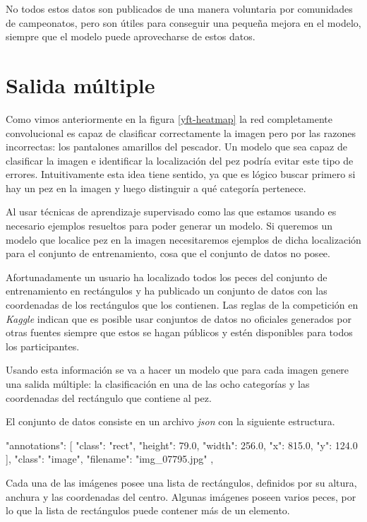 No todos estos datos son publicados de una manera voluntaria por comunidades de campeonatos, pero son útiles para conseguir una pequeña mejora en el modelo, siempre que el modelo puede aprovecharse de estos datos.

\section{Salida múltiple}

Como vimos anteriormente en la figura \ref{yft-heatmap} la red completamente
convolucional es capaz de clasificar correctamente la imagen pero por las
razones incorrectas: los pantalones amarillos del pescador. Un modelo que sea
capaz de clasificar la imagen e identificar la localización del pez podría
evitar este tipo de errores. Intuitivamente esta idea tiene sentido, ya que es lógico
buscar primero si hay un pez en la imagen y luego distinguir a qué categoría
pertenece.

Al usar técnicas de aprendizaje supervisado como las que estamos usando es
necesario ejemplos resueltos para poder generar un modelo. Si queremos un modelo
que localice pez en la imagen necesitaremos ejemplos de dicha
localización para el conjunto de entrenamiento, cosa que el conjunto de datos no posee.

Afortunadamente un usuario ha localizado todos los peces del conjunto de
entrenamiento en rectángulos y ha publicado un conjunto de datos con las
coordenadas de los rectángulos que los contienen. Las reglas de la competición
en \textit{Kaggle} indican que es posible usar conjuntos de datos no oficiales
generados por otras fuentes siempre que estos se hagan públicos y estén
disponibles para todos los participantes.

Usando esta información se va a hacer un modelo que para cada imagen genere una
salida múltiple: la clasificación en una de las ocho categorías y las
coordenadas del rectángulo que contiene al pez.

El conjunto de datos consiste en un archivo \textit{json} con la siguiente estructura.

\begin{python}
{
    "annotations": [
        {
            "class": "rect",
            "height": 79.0,
            "width": 256.0,
            "x": 815.0,
            "y": 124.0
        }
    ],
    "class": "image",
    "filename": "img_07795.jpg"
},
\end{python}

Cada una de las imágenes posee una lista de rectángulos, definidos por su
altura, anchura y las coordenadas del centro. Algunas imágenes poseen varios
peces, por lo que la lista de rectángulos puede contener más de un elemento.

